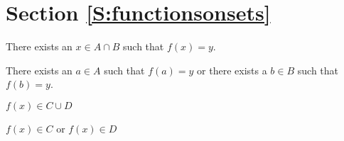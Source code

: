 \section*{Section \ref{S:functionsonsets}}

\begin{list}{\bf{\ref{exer:sec91-1}.}}
\item \begin{list}{\bf{(a)}}
\item There exists an $x \in A \cap B$ such that $f ( x ) = y$.
\end{list}
\end{list}

\begin{list}{}
\item \begin{list}{\bf{(d)}}
\item There exists an $a \in A$ such that $f ( a ) = y$ or there exists a 
$b \in B$ such that $f ( b ) = y$.
\end{list}
\end{list}

\begin{list}{}
\item \begin{list}{\bf{(f)}}
\item $f ( x ) \in C \cup D$
\end{list}
\end{list}

\begin{list}{}
\item \begin{list}{\bf{(h)}}
\item $f ( x ) \in C$ or $f ( x ) \in D$
\end{list}
\end{list}


